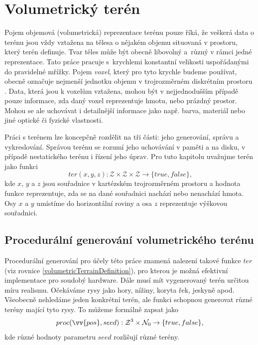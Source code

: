 \chapter{Volumetrický terén} \label{ch:volumetricTerrain}
Pojem objemová (volumetrická) reprezentace terénu pouze říká, že veškerá data o terénu jsou vždy vztažena na tělesa o nějakém objemu situovaná v prostoru, který terén definuje. Tvar těles může být obecně libovolný a~různý v rámci jedné reprezentace. Tato práce pracuje s~krychlemi konstantní velikosti uspořádanými do pravidelné mřížky. Pojem \textit{voxel}, který pro tyto krychle budeme používat, obecně označuje nejmenší jednotku objemu v trojrozměrném diskrétním prostoru \cite{ZaraJiri2004Mpg}. Data, která jsou k voxelům vztažena, mohou být v nejjednodušším případě pouze informace, zda daný voxel reprezentuje hmotu, nebo prázdný prostor. Mohou se ale uchovávat i detailnější informace jako např. barva, materiál nebo jiné optické či fyzické vlastnosti.


Práci s terénem lze koncepčně rozdělit na tři části: jeho generování, správu a vykreslování. Správou terénu se rozumí jeho uchovávání v paměti a na disku, v případě nestatického terénu i řízení jeho úprav. Pro tuto kapitolu uvažujme terén jako funkci
\begin{equation}\label{volumetricTerrainDefinition}
	ter(x,y,z) : \mathcal{Z} \times \mathcal{Z} \times \mathcal{Z} \rightarrow \{true, false\} \text{,}
\end{equation}
kde $x$, $y$ a $z$ jsou souřadnice v kartézském trojrozměrném prostoru a hodnota funkce reprezentuje, zda se na dané souřadnici nachází nebo nenachází hmota. Osy $x$ a $y$ umístíme do horizontální roviny a osa $z$ reprezentuje výškovou souřadnici.

\section{Procedurální generování volumetrického terénu} \label{sect:procGenPrinciples}
Procedurální generování pro účely této práce znamená nalezení takové funkce $ter$ (viz rovnice \ref{volumetricTerrainDefinition}), pro kterou je možná efektivní implementace pro soudobý hardware. Dále musí mít vygenerovaný terén určitou míru realismu. Očekáváme rysy jako hory, nížiny, koryta řek, jeskyně apod. Všeobecně nehledáme jeden konkrétní terén, ale funkci schopnou generovat různé terény mající tyto rysy. To můžeme formálně zapsat jako
\begin{equation}
	proc(\vv{pos}, seed): \mathcal{Z}^3 \times \mathcal{N}_0 \rightarrow \{true, false\} \text{,}
\end{equation}
kde různé hodnoty parametru $seed$ rozlišují různé terény.

